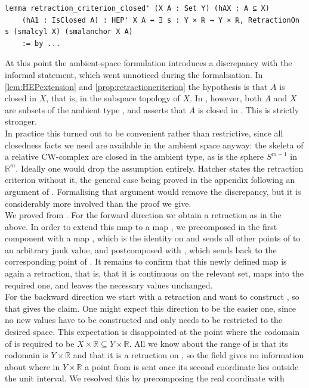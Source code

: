 \documentclass[11pt, a4paper, english]{article}
\theoremstyle{plain}
\theoremstyle{definition}
\theoremstyle{remark}
\numberwithin{equation}{section}
\numberwithin{theorem}{section}
\begin{document}
\begin{verbatim}
lemma retraction_criterion_closed' (X A : Set Y) (hAX : A ⊆ X)
    (hA1 : IsClosed A) : HEP' X A ↔ ∃ s : Y × ℝ → Y × ℝ, RetractionOn s (smalcyl X) (smalanchor X A)
    := by ...
\end{verbatim}
At this point the ambient-space formulation introduces a discrepancy with the informal statement, which went unnoticed during the formalisation. In \cref{lem:HEPextension} and \cref{prop:retractioncriterion} the hypothesis is that $A$ is closed in $X$, that is, in the subspace topology of $X$. In , however, both $A$ and $X$ are subsets of the ambient type , and  asserts that $A$ is closed in
. This is strictly stronger. \\
In practice this turned out to be convenient rather than restrictive, since all closedness facts we need are available in the ambient space anyway: the skeleta of a relative CW-complex are closed in the ambient type, as is the sphere $S^{m-1}$ in $\mathbb{R}^m$. Ideally one would drop the assumption entirely. Hatcher \cite{HAT01} states the retraction criterion without it, the general case being proved in the appendix following an argument of \cite{STM}. Formalising that argument would remove the discrepancy, but it is considerably more involved than the proof we give. \\
We proved  from . For the forward direction we obtain a retraction  as in the  above. In order to extend this map  to a map , we precomposed in the first component with a map , which is the identity on  and sends all other points of  to an arbitrary junk value, and postcomposed with , which sends  back to the corresponding point of . It remains to confirm that this newly defined map is again a retraction, that is, that it is continuous on the relevant set, maps into the required one, and leaves the necessary values unchanged. \\
For the backward direction we start with a retraction  and want to construct , so that  gives the claim. One might expect this direction to be the easier one, since no new values have to be constructed and  only needs to be restricted to the desired space. This expectation is disappointed at the point where the codomain of  is required to be $X \times \mathbb{R} \subseteq Y \times \mathbb{R}$. All we know about the range of  is that its codomain is $Y \times \mathbb{R}$ and that it is a retraction on , so the field  gives no information about where in $Y \times \mathbb{R}$ a point from  is sent once its second coordinate lies outside the unit interval. We resolved this by precomposing the real coordinate with
\end{document}
